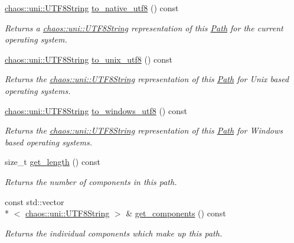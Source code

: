 \begin{DoxyCompactItemize}
\hyperlink{classchaos_1_1uni_1_1_u_t_f8_string}{chaos\-::uni\-::\-U\-T\-F8\-String} \hyperlink{classchaos_1_1io_1_1sys_1_1_path_a54f385bf11c8bf289adfb6ac3e8e9d46}{to\-\_\-native\-\_\-utf8} () const 
\begin{DoxyCompactList}\small\item\em Returns a \hyperlink{classchaos_1_1uni_1_1_u_t_f8_string}{chaos\-::uni\-::\-U\-T\-F8\-String} representation of this \hyperlink{classchaos_1_1io_1_1sys_1_1_path}{Path} for the current operating system. \end{DoxyCompactList}\item 
\hyperlink{classchaos_1_1uni_1_1_u_t_f8_string}{chaos\-::uni\-::\-U\-T\-F8\-String} \hyperlink{classchaos_1_1io_1_1sys_1_1_path_aa748ab64ab5d3b0efcd72a25947b5f35}{to\-\_\-unix\-\_\-utf8} () const 
\begin{DoxyCompactList}\small\item\em Returns the \hyperlink{classchaos_1_1uni_1_1_u_t_f8_string}{chaos\-::uni\-::\-U\-T\-F8\-String} representation of this \hyperlink{classchaos_1_1io_1_1sys_1_1_path}{Path} for Unix based operating systems. \end{DoxyCompactList}\item 
\hyperlink{classchaos_1_1uni_1_1_u_t_f8_string}{chaos\-::uni\-::\-U\-T\-F8\-String} \hyperlink{classchaos_1_1io_1_1sys_1_1_path_a02ef021f45851068ac79e9cd25c88298}{to\-\_\-windows\-\_\-utf8} () const 
\begin{DoxyCompactList}\small\item\em Returns the \hyperlink{classchaos_1_1uni_1_1_u_t_f8_string}{chaos\-::uni\-::\-U\-T\-F8\-String} representation of this \hyperlink{classchaos_1_1io_1_1sys_1_1_path}{Path} for Windows based operating systems. \end{DoxyCompactList}\item 
size\-\_\-t \hyperlink{classchaos_1_1io_1_1sys_1_1_path_a622fadb20bc01a0b58ef19eaf37fb44c}{get\-\_\-length} () const 
\begin{DoxyCompactList}\small\item\em Returns the number of components in this path. \end{DoxyCompactList}\item 
const std\-::vector\\*
$<$ \hyperlink{classchaos_1_1uni_1_1_u_t_f8_string}{chaos\-::uni\-::\-U\-T\-F8\-String} $>$ \& \hyperlink{classchaos_1_1io_1_1sys_1_1_path_ae20cae838af510b945e716d529e19bf4}{get\-\_\-components} () const 
\begin{DoxyCompactList}\small\item\em Returns the individual components which make up this path. \end{DoxyCompactList}\item 

\end{DoxyCompactItemize}
